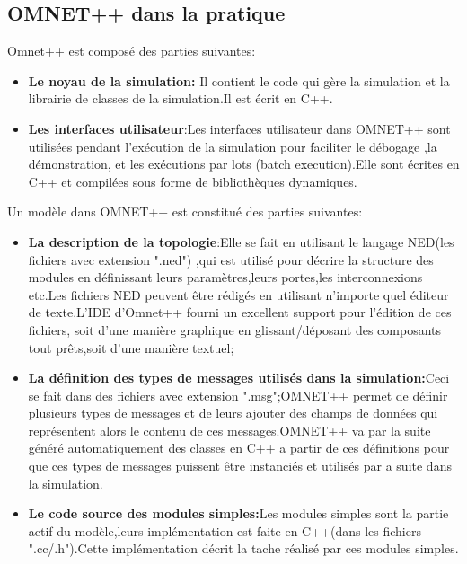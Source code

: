 \subsection{OMNET++ dans la pratique}

Omnet++ est composé des parties suivantes:

\begin{itemize}
\item \textbf{ Le noyau de la simulation:} Il contient le code qui gère la simulation et la librairie de classes de la simulation.Il est écrit en C++.
\item \textbf{ Les interfaces utilisateur}:Les interfaces utilisateur dans OMNET++ sont utilisées pendant l'exécution de la simulation pour faciliter le débogage  ,la démonstration, et les exécutions par lots (batch execution).Elle sont écrites en C++ et compilées sous forme de bibliothèques dynamiques.	
\end{itemize}

Un modèle dans OMNET++ est constitué des parties suivantes:
\begin{itemize}
	\item \textbf{La description de la topologie}:Elle se fait en utilisant le langage NED(les fichiers avec extension ".ned") ,qui est utilisé pour décrire la structure des modules en définissant leurs paramètres,leurs portes,les interconnexions etc.Les fichiers NED peuvent être rédigés en utilisant n'importe quel éditeur de texte.L'IDE d'Omnet++ fourni un excellent support pour l'édition de ces fichiers, soit d'une manière graphique en glissant/déposant des composants tout prêts,soit d'une manière textuel;
	\item\textbf{ La définition des types de messages utilisés dans la simulation:}Ceci se fait dans des fichiers avec extension ".msg";OMNET++ permet de définir plusieurs types de messages  et de leurs ajouter des champs de données qui représentent alors le contenu de ces messages.OMNET++ va par la suite généré automatiquement des classes en C++ a partir de ces définitions pour que ces types de messages puissent être instanciés et utilisés par a suite dans la simulation.
	\item \textbf{Le code source des modules simples:}Les modules simples sont la partie actif du modèle,leurs implémentation est faite en C++(dans les fichiers ".cc/.h").Cette implémentation décrit la tache réalisé par ces modules simples.
\end{itemize}	

